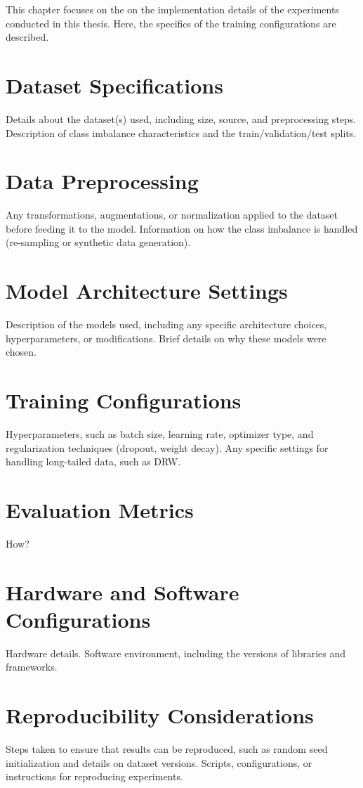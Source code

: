 
This chapter focuses on the on the implementation details of the experiments conducted in this thesis. Here, the specifics of the training configurations are described. 

\section{Dataset Specifications}
Details about the dataset(s) used, including size, source, and preprocessing steps.
Description of class imbalance characteristics and the train/validation/test splits.

\section{Data Preprocessing}
Any transformations, augmentations, or normalization applied to the dataset before feeding it to the model.
Information on how the class imbalance is handled (re-sampling or synthetic data generation).

\section{Model Architecture Settings}
Description of the models used, including any specific architecture choices, hyperparameters, or modifications.
Brief details on why these models were chosen.

\section{Training Configurations}
Hyperparameters, such as batch size, learning rate, optimizer type, and regularization techniques (dropout, weight decay).
Any specific settings for handling long-tailed data, such as DRW.

\section{Evaluation Metrics}
How?

\section{Hardware and Software Configurations}
Hardware details.
Software environment, including the versions of libraries and frameworks.

\section{Reproducibility Considerations}
Steps taken to ensure that results can be reproduced, such as random seed initialization and details on dataset versions.
Scripts, configurations, or instructions for reproducing experiments.
